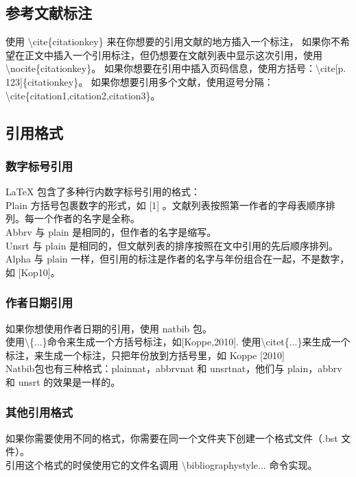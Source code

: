 \documentclass[a4paper,12pt]{article}
\begin{document}
        
        \subsection{参考文献标注}
        \indent 使用 \textbackslash cite\{citationkey\} 来在你想要的引用文献的地方插入一个标注，
        \indent 如果你不希望在正文中插入一个引用标注，但仍想要在文献列表中显示这次引用，使用 \textbackslash nocite\{citationkey\}。
        \indent 如果你想要在引用中插入页码信息，使用方括号：\textbackslash cite[p. 123]\{citationkey\}。
        \indent 如果你想要引用多个文献，使用逗号分隔：\textbackslash cite\{citation1,citation2,citation3\}。
        

        \subsection{引用格式}
            \subsubsection{数字标号引用}
            LaTeX 包含了多种行内数字标号引用的格式：
            \\ \indent Plain 方括号包裹数字的形式，如 [1] 。文献列表按照第一作者的字母表顺序排列。每一个作者的名字是全称。
            \\ \indent Abbrv 与 plain 是相同的，但作者的名字是缩写。
            \\ \indent Unsrt 与 plain 是相同的，但文献列表的排序按照在文中引用的先后顺序排列。
            \\ \indent Alpha 与 plain 一样，但引用的标注是作者的名字与年份组合在一起，不是数字，如 [Kop10]。   
            
            \subsubsection{作者日期引用}
            如果你想使用作者日期的引用，使用 natbib 包。
            \\ \indent 使用\textbackslash \{...\}命令来生成一个方括号标注，如[Koppe,2010].
            使用\textbackslash citet\{...\}来生成一个标注，来生成一个标注，只把年份放到方括号里，如 Koppe [2010]
            \\ \indent Natbib包也有三种格式：plainnat，abbrvnat 和 unsrtnat，他们与 plain，abbrv 和 unsrt 的效果是一样的。

            \subsubsection{其他引用格式}
            如果你需要使用不同的格式，你需要在同一个文件夹下创建一个格式文件（.bst 文件）。
            \\ 引用这个格式的时侯使用它的文件名调用 \textbackslash bibliographystyle{...} 命令实现。
\end{document}
